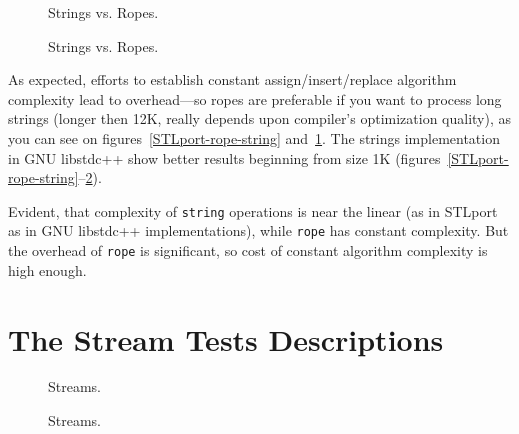 \documentclass[a4paper]{article}
\providecommand{\STLport}{{\fontfamily{cmss}\selectfont STLport}}
\providecommand{\libstd}{{\fontfamily{cmtt}\selectfont GNU \mbox{libstdc++}}}
\begin{document}
\begin{figure}
  \begin{center}
    
  \end{center}
  \caption{Strings vs. Ropes.\label{STLport-rope-string-1}}
\end{figure}

\begin{figure}
  \begin{center}
    
  \end{center}
  \caption{Strings vs. Ropes.\label{STLport-rope-string-2}}
\end{figure}

As expected, efforts to establish constant assign/insert/replace
algorithm complexity lead to
overhead---so ropes are preferable if you want to process
long strings (longer then 12K, really depends upon compiler's optimization quality), as you can see on figures~\ref{STLport-rope-string} and~\ref{STLport-rope-string-1}.
The strings implementation in \libstd{} show better results beginning from size 1K
(figures~\ref{STLport-rope-string}--\ref{STLport-rope-string-2}).

Evident, that complexity of \texttt{string} operations is near the linear
(as in \STLport{} as in \libstd{} implementations),
while \texttt{rope} has constant complexity. But the overhead
of \texttt{rope} is significant, so cost of constant algorithm complexity
is high enough.


\section{The Stream Tests Descriptions\label{StreamTestsDescr}}

\begin{figure}
  \begin{center}
    
  \end{center}
  \caption{Streams.\label{streams}}
\end{figure}

\begin{figure}
  \begin{center}
    
  \end{center}
  \caption{Streams.\label{streamsOne}}
\end{figure}
\end{document}
